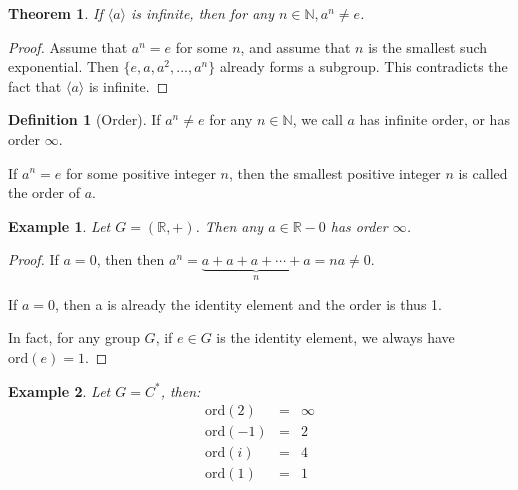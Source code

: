 \documentclass{article}
\theoremstyle{MyNonumberplain}
\theoremstyle{break}
\newtheorem*{proof}{Proof. }
\newcommand{\R}{\mathbb{R}}
\newcommand{\N}{\mathbb{N}}
\newcommand{\cyclic}[1]{\langle #1 \rangle}
\newcommand{\ord}[1]{\text{ord}(#1)}
\theoremstyle{break}
\newtheorem{theorem}{Theorem}[section]
\newtheorem{example}{Example}[section]
\theoremstyle{break}
\theoremstyle{definition}
\theoremstyle{break}
\newtheorem{definition}{Definition}[section]
\begin{document}
\begin{thmbox}
    \begin{theorem}
        If $\cyclic{a}$ is infinite, then for any $n\in\N, a^n \neq e$.
    \end{theorem}
    \begin{prfbox}
        \begin{proof}
            Assume that $a^n=e$ for some $n$, and assume that $n$ is the smallest such exponential.\bigskip
            Then $\{e,a,a^2,...,a^n\}$ already forms a subgroup. This contradicts the fact that $\cyclic{a}$ is infinite.
        \end{proof}
    \end{prfbox}    
\end{thmbox}


\begin{defbox}
    \begin{definition}[Order]
        If $a^n\neq e$ for any $n\in\N$, we call $a$ has infinite order, or has order $\infty$.\bigskip

        If $a^n=e$ for some positive integer $n$, then the smallest positive integer $n$ is called the order of $a$.
    \end{definition}
\end{defbox}

\begin{expbox}
    \begin{example}
        Let $G=(\R,+)$. Then any $a\in\R-{0}$ has order $\infty$.
    \end{example}

    \begin{prfbox}
        \begin{proof}
            If $a=0$, then then $a^n = \underset{n}{\underbrace{a + a + a + \cdots + a}} = n a \neq 0$.\bigskip

            If $a=0$, then a is already the identity element and the order is thus 1.\bigskip

            In fact, for any group $G$, if $e\in G$ is the identity element, we always have $\ord{e}=1$. 
        \end{proof}
    \end{prfbox}
    
\end{expbox}



\begin{expbox}
    \begin{example}
        Let $G=C^*$, then:
        \begin{eqnarray*}
            \ord{2} & = & \infty \\
            \ord{-1} & = & 2\\
            \ord{i} & = & 4\\
            \ord{1} & = & 1\\
        \end{eqnarray*}
    \end{example}
\end{expbox}
\end{document}
